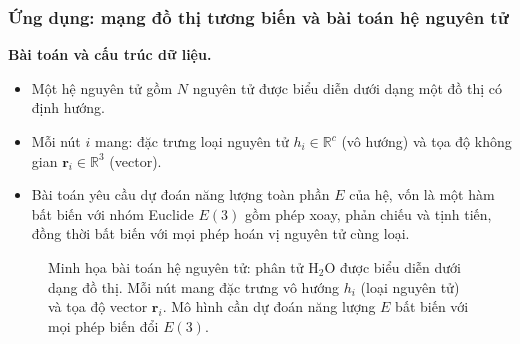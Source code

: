 
\subsubsection{Ứng dụng: mạng đồ thị tương biến và bài toán hệ nguyên tử}
\label{subsubsec:equivariant-gnn}

\textbf{Bài toán và cấu trúc dữ liệu.}

\begin{itemize}
    \item Một hệ nguyên tử gồm $N$ nguyên tử được biểu diễn dưới dạng một đồ thị có định hướng.
    \item Mỗi nút $i$ mang: đặc trưng loại nguyên tử $h_i \in \mathbb{R}^c$ (vô hướng) và tọa độ không gian $\mathbf{r}_i \in \mathbb{R}^3$ (vector).
    \item Bài toán yêu cầu dự đoán năng lượng toàn phần $E$ của hệ, vốn là một hàm bất biến với nhóm Euclide $E(3)$ gồm phép xoay, phản chiếu và tịnh tiến, đồng thời bất biến với mọi phép hoán vị nguyên tử cùng loại.
\end{itemize}

\begin{figure}[H]
\centering
{}
\caption{Minh họa bài toán hệ nguyên tử: phân tử $\text{H}_2\text{O}$ được biểu diễn dưới dạng đồ thị. Mỗi nút mang đặc trưng vô hướng $h_i$ (loại nguyên tử) và tọa độ vector $\mathbf{r}_i$. Mô hình cần dự đoán năng lượng $E$ bất biến với mọi phép biến đổi $E(3)$.}
\label{fig:molecule-graph}
\end{figure}

